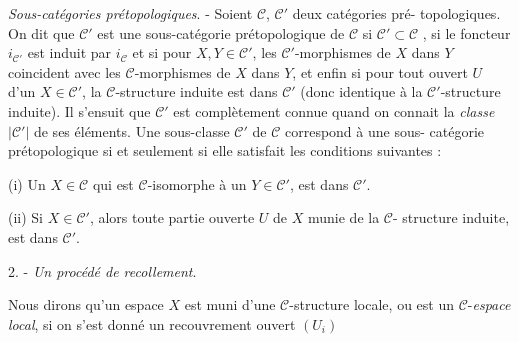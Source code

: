 \emph{Sous-catégories prétopologiques}. - Soient $\mathcal{C}$, $\mathcal{C}'$ deux catégories pré-
topologiques. On dit que $\mathcal{C}'$ est une sous-catégorie prétopologique de $\mathcal{C}$
si $\mathcal{C}' \subset \mathcal{C}$ , si le foncteur $i_{\mathcal{C}'}$ est induit par $i_{\mathcal{C}}$ et si pour
$X, Y \in \mathcal{C}'$, les $\mathcal{C}'$-morphismes de $X$ dans $Y$ coincident avec les $\mathcal{C}$-morphismes
de $X$ dans $Y$, et enfin si pour tout ouvert $U$ d'un $X \in \mathcal{C}'$, la $\mathcal{C}$-structure
induite est dans $\mathcal{C}'$ (donc identique à la $\mathcal{C}'$-structure induite). Il
s'ensuit que $\mathcal{C}'$ est complètement connue quand on connait la \emph{classe}
$|\mathcal{C}'|$ de ses éléments. Une sous-classe $\mathcal{C}'$ de $\mathcal{C}$ correspond à une sous-
catégorie prétopologique si et seulement si elle satisfait les conditions
suivantes :

(i) Un $X \in \mathcal{C}$ qui est $\mathcal{C}$-isomorphe à un $Y \in \mathcal{C}'$, est dans $\mathcal{C}'$.

(ii) Si $X \in \mathcal{C}'$, alors toute partie ouverte $U$ de $X$ munie de la $\mathcal{C}$-
structure induite, est dans $\mathcal{C}'$.

2. - \emph{Un procédé de recollement}.

Nous dirons qu'un espace $X$ est muni d'une $\mathcal{C}$-structure locale, ou
est un $\mathcal{C}$-\emph{espace local}, si on s'est donné un recouvrement ouvert $(U_i)$

\newpage



